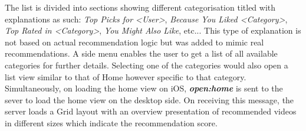 The list is divided into sections showing different
categorisation titled with explanations as such: \textit{Top Picks for <User>},
\textit{Because You Liked <Category>}, \textit{Top Rated in <Category>}, \textit{You Might Also Like}, etc... This type of explanation is not based on actual recommendation logic but was added to mimic real recommendations. A side menu enables the user to get a list of all available categories for further details. Selecting one of the categories would also open a list view similar to that of Home however specific to that category.
Simultaneously, on loading the home view on iOS, \textbf{\textit{open:home}} is sent to the sever to load the home view on the desktop side. On receiving this message, the server loads a Grid layout with an overview presentation of recommended videos in different sizes which indicate the recommendation score.


